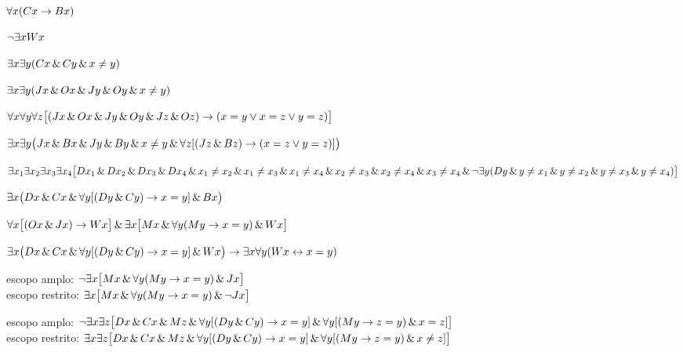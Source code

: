 \begin{earg}
\item %
$\forall x(Cx \rightarrow Bx)$
\item %
$\neg\exists x Wx$
\item %
$\exists x \exists y(Cx \,\&\, Cy \,\&\, x\neq y)$
\item %
$\exists x \exists y(Jx \,\&\, Ox \,\&\, Jy \,\&\, Oy \,\&\, x\neq y)$
\item %
$\forall x\forall y\forall z\bigl[(Jx \,\&\, Ox \,\&\, Jy \,\&\, Oy \,\&\, Jz \,\&\, Oz)\rightarrow(x=y \vee x=z \vee y=z)\bigr]$
\item %
$\exists x\exists y\bigl(Jx \,\&\, Bx \,\&\, Jy \,\&\, By \,\&\, x \neq y\,\&\, \forall z[(Jz \,\&\, Bz) \rightarrow (x=z \vee y=z)]\bigr)$
\item %
$\exists x_1\exists x_2\exists x_3\exists x_4\bigl[Dx_1 \,\&\, Dx_2 \,\&\, Dx_3 \,\&\, Dx_4 \,\&\, x_1 \neq x_2 \,\&\, x_1 \neq x_3 \,\&\, x_1 \neq x_4 \,\&\, x_2 \neq x_3 \,\&\, x_2 \neq x_4 \,\&\, x_3 \neq x_4  \,\&\, \neg\exists y(Dy \,\&\, y\neq x_1 \,\&\, y\neq x_2 \,\&\, y\neq x_3 \,\&\, y\neq x_4)\bigr]$
\item %
$\exists x\bigl(Dx \,\&\, Cx \,\&\, \forall y[(Dy\,\&\, Cy) \rightarrow x=y] \,\&\, Bx\bigr)$
\item %
$\forall x\bigl[(Ox \,\&\, Jx) \rightarrow Wx\bigr] \,\&\, \exists x\bigl[Mx \,\&\, \forall y(My \rightarrow x=y) \,\&\, Wx\bigr]$
\item %
$\exists x\bigl(Dx \,\&\, Cx \,\&\, \forall y[(Dy\,\&\, Cy) \rightarrow x=y] \,\&\, Wx\bigr)\rightarrow \exists x\forall y(Wx \leftrightarrow x=y)$
\item %
escopo amplo: $\neg \exists x\bigl[Mx \,\&\, \forall y(My \rightarrow x=y) \,\&\, Jx\bigr]$\\
escopo restrito: $\exists x\bigl[Mx \,\&\, \forall y(My \rightarrow x=y) \,\&\, \neg Jx\bigr]$
\item %
escopo amplo: $\neg \exists x\exists z\bigl[Dx \,\&\, Cx \,\&\, Mz \,\&\, \forall y[(Dy\,\&\, Cy) \rightarrow x=y]  \,\&\, \forall y[(My \rightarrow z=y) \,\&\, x=z]\bigr]$\\
escopo restrito: $\exists x\exists z\bigl[Dx \,\&\, Cx \,\&\, Mz \,\&\, \forall y[(Dy\,\&\, Cy) \rightarrow x=y]  \,\&\, \forall y[(My \rightarrow z=y) \,\&\, x\neq z]\bigr]$
\end{earg}





